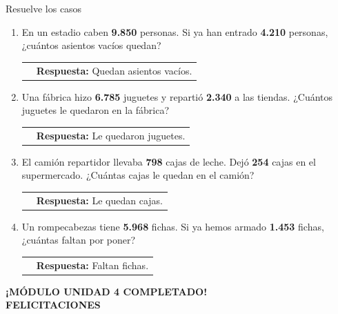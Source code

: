 \documentclass[12pt, letterpaper]{article}
\newcommand{\boxfill}[1][1.2cm]{\tcbox[on line, size=minimal, colframe=valdark!80, colback=white, boxrule=0.5pt, arc=1mm, boxsep=2pt, left=2pt, right=2pt, top=2pt, bottom=2pt]{\makebox[#1]{\vphantom{M}}}}
\begin{document}
\begin{practica}{Resuelve los casos}
\begin{enumerate}[itemsep=1.5cm]
			\item En un estadio caben \textbf{9.850} personas. Si ya han entrado \textbf{4.210} personas, ¿cuántos asientos vacíos quedan? \\
			\begin{tabular}{c c}
				\makebox[5cm]{ \boxfill[3cm] } & \textbf{Respuesta:} Quedan \boxfill[1.5cm] asientos vacíos.
			\end{tabular}
			
			\item Una fábrica hizo \textbf{6.785} juguetes y repartió \textbf{2.340} a las tiendas. ¿Cuántos juguetes le quedaron en la fábrica? \\
			\begin{tabular}{c c}
				\makebox[5cm]{ \boxfill[3cm] } & \textbf{Respuesta:} Le quedaron \boxfill[1.5cm] juguetes.
			\end{tabular}
			
			\item El camión repartidor llevaba \textbf{798} cajas de leche. Dejó \textbf{254} cajas en el supermercado. ¿Cuántas cajas le quedan en el camión? \\
			\begin{tabular}{c c}
				\makebox[5cm]{ \boxfill[3cm] } & \textbf{Respuesta:} Le quedan \boxfill[1.5cm] cajas.
			\end{tabular}
			
			\item Un rompecabezas tiene \textbf{5.968} fichas. Si ya hemos armado \textbf{1.453} fichas, ¿cuántas faltan por poner? \\
			\begin{tabular}{c c}
				\makebox[5cm]{ \boxfill[3cm] } & \textbf{Respuesta:} Faltan \boxfill[1.5cm] fichas.
			\end{tabular}
		\end{enumerate}
		\vspace{0.2cm}
	\end{practica}
	
	\vspace{1cm}
	\begin{center}
		\begin{tcolorbox}[colback=valblue!10, colframe=valblue, width=14cm, arc=3mm, boxrule=1.5pt]
			\centering \Large \textbf{¡MÓDULO UNIDAD 4 COMPLETADO!\\
			FELICITACIONES}\\[0.2cm]
		\end{tcolorbox}
	\end{center}
	
\end{document}
